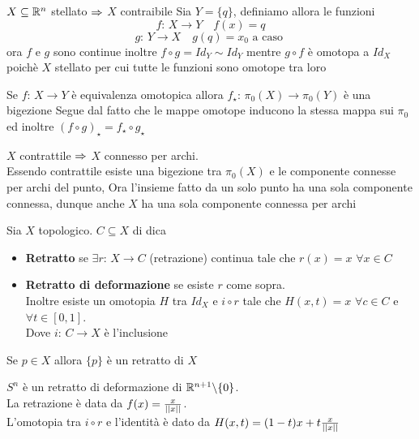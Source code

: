 \begin{prop}$X \subseteq \mathbb{R}^n$ stellato $\Rightarrow$ $X$ contraibile
\proof Sia $Y=\{ q\}$, definiamo allora le funzioni
$$ f:\, X \to Y \quad f(x)=q $$ 
$$ g:\, Y \to X \quad g(q)=x_0 \text{ a caso } $$
ora $f$ e $g$ sono continue inoltre $f \circ g = Id_Y \sim Id_Y$ mentre $g \circ f $ \`e omotopa a $Id_X$ poich\`e $X$ stellato per cui tutte le funzioni sono omotope tra loro
\endproof
\end{prop}
\begin{prop}Se $f:\, X \to Y$  \`e equivalenza omotopica allora $f_\star:\, \pi_0(X) \to \pi_0(Y)$ \`e una bigezione
\proof Segue dal fatto che le mappe omotope inducono la stessa mappa sui $\pi_0$ ed inoltre $( f\circ g)_\star = f_\star \circ g_\star$
\end{prop}
\begin{oss}$X$ contrattile $\Rightarrow$ $X$ connesso per archi.\\
Essendo contrattile esiste una bigezione tra $\pi_0(X)$ e le componente connesse per archi del punto, Ora l'insieme fatto da un solo punto ha una sola componente connessa, dunque anche $X$ ha una sola componente connessa per archi
\end{oss}
\begin{defn}Sia $X$ topologico. $C \subseteq X$ di dica
\begin{itemize}
\item \textbf{Retratto } se $\exists r:\, X \to C$ (retrazione) continua tale che $r(x)=x$ $\forall x\in C$
\item \textbf{Retratto di deformazione} se esiste $r$ come sopra.\\
Inoltre esiste un omotopia $H$ tra $Id_X$ e $i \circ r$ tale che  $H(x,t)=x$ $\forall c \in C $ e $\forall t \in [0,1]$.\\
Dove $i:\, C \to X$ \`e l'inclusione
\end{itemize}
\end{defn}
\begin{ese}Se $p\in X$ allora $\{ p\}$ \`e un retratto di $X$
\end{ese}
\begin{ese}$S^n$ \`e un retratto di deformazione di $\mathbb{R}^{n+1}\backslash \{0\}$.\\
La retrazione \`e data da $f(x)= \frac{x}{\vert \vert x \vert \vert}$.\\
L'omotopia tra $i \circ r $ e l'identit\`a \`e dato da 
$H(x,t)=(1-t) x + t \frac{x}{\vert \vert x \vert \vert}$ 
\end{ese}
